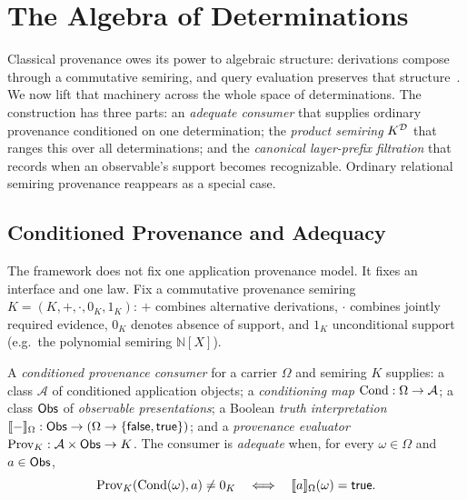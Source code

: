 \section{The Algebra of Determinations}
\label{sec:algebra}

Classical provenance owes its power to algebraic structure: derivations
compose through a commutative semiring, and query evaluation preserves that
structure~\cite{green2007provenance}. We now lift that machinery across the
whole space of determinations. The construction has three parts: an
\emph{adequate consumer} that supplies ordinary provenance conditioned on one
determination; the \emph{product semiring} $K^{\mathcal{D}}$ that ranges this over
all determinations; and the \emph{canonical layer-prefix filtration} that
records when an observable's support becomes recognizable. Ordinary relational
semiring provenance reappears as a special case.

\subsection{Conditioned Provenance and Adequacy}
\label{sec:adequacy}

The framework does not fix one application provenance model. It fixes an
interface and one law. Fix a commutative provenance semiring
$K = (K, +, \cdot, 0_K, 1_K)$: $+$ combines alternative derivations, $\cdot$
combines jointly required evidence, $0_K$ denotes absence of support, and
$1_K$ unconditional support (e.g.\ the polynomial semiring $\mathbb{N}[X]$).

\begin{definition}
  \label{def:consumer}
  A \emph{conditioned provenance consumer} for a carrier $\Omega$ and semiring
  $K$ supplies: a class $\mathcal{A}$ of conditioned application objects; a
  \emph{conditioning map} $\operatorname{Cond} : \Omega \to \mathcal{A}$; a class $\mathsf{Obs}$ of
  \emph{observable presentations}; a Boolean \emph{truth interpretation}
  $\llbracket - \rrbracket_\Omega : \mathsf{Obs} \to (\Omega \to \{\mathsf{false}, \mathsf{true}\})$; and a
  \emph{provenance evaluator} $\operatorname{Prov}_K : \mathcal{A} \times \mathsf{Obs} \to K$. The
  consumer is \emph{adequate} when, for every $\omega \in \Omega$ and
  $a \in \mathsf{Obs}$,
  \[
    \operatorname{Prov}_K(\operatorname{Cond}(\omega), a) \neq 0_K
    \quad\Longleftrightarrow\quad
    \llbracket a \rrbracket_\Omega(\omega) = \mathsf{true} .
  \]
\end{definition}

